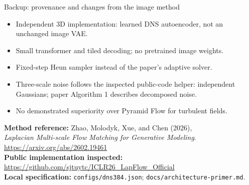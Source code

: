 \documentclass[aspectratio=169,11pt]{beamer}
\begin{document}
\begin{frame}{Backup: provenance and changes from the image method}
  \small
  \begin{itemize}
    \item Independent 3D implementation: learned DNS autoencoder, not an unchanged image VAE.
    \item Small transformer and tiled decoding; no pretrained image weights.
    \item Fixed-step Heun sampler instead of the paper's adaptive solver.
    \item Three-scale noise follows the inspected public-code helper:
          independent Gaussians; paper Algorithm 1 describes decomposed noise.
    \item No demonstrated superiority over Pyramid Flow for turbulent fields.
  \end{itemize}
  \medskip
  \textbf{Method reference:} Zhao, Molodyk, Xue, and Chen (2026),\\
  \emph{Laplacian Multi-scale Flow Matching for Generative Modeling}.\\
  \url{https://arxiv.org/abs/2602.19461}\\[0.4em]
  \textbf{Public implementation inspected:}\\
  \url{https://github.com/sjtuytc/ICLR26_LapFlow_Official}\\[0.4em]
  \textbf{Local specification:} \texttt{configs/dns384.json};
  \texttt{docs/architecture-primer.md}.
\end{frame}
\end{document}
